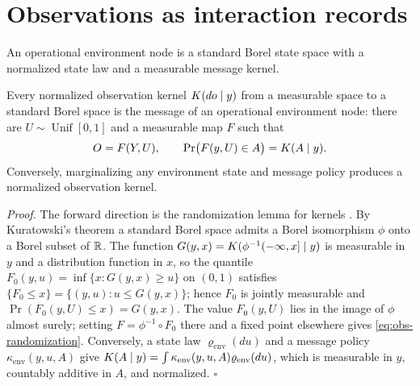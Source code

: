 \section{Observations as interaction records}
\label{sec:local-observation-equivalence}

An operational environment node is a standard Borel state space with a
normalized state law and a measurable message kernel.

Every normalized observation kernel $K(do\mid y)$ from a measurable space to a
standard Borel space is the message of an operational environment node: there
are $U\sim\operatorname{Unif}[0,1]$ and a measurable map $F$ such that
\begin{equation}
O=F(Y,U),
\qquad
\Pr\bigl(F(y,U)\in A\bigr)=K(A\mid y).
\label{eq:obs-randomization}
\end{equation}
Conversely, marginalizing any environment state and message policy produces a
normalized observation kernel. 

\noindent\emph{Proof.}
The forward direction is the randomization lemma for kernels
\citep{Kallenberg2021}. By Kuratowski's theorem a standard Borel space admits a
Borel isomorphism $\phi$ onto a Borel subset of $\mathbb R$. The function
$G(y,x)=K(\phi^{-1}(-\infty,x]\mid y)$ is measurable in $y$ and a
distribution function in $x$, so the quantile
$F_0(y,u)=\inf\{x:G(y,x)\geq u\}$ on $(0,1)$ satisfies
$\{F_0\leq x\}=\{(y,u):u\leq G(y,x)\}$; hence $F_0$ is jointly measurable and
$\Pr(F_0(y,U)\leq x)=G(y,x)$. The value $F_0(y,U)$ lies in the image of $\phi$
almost surely; setting $F=\phi^{-1}\circ F_0$ there and a fixed point elsewhere
gives \eqref{eq:obs-randomization}. Conversely, a state law
$\varrho_{\mathrm{env}}(du)$ and a message policy
$\kappa_{\mathrm{env}}(y,u,A)$ give
$K(A\mid y)=\int\kappa_{\mathrm{env}}(y,u,A)\varrho_{\mathrm{env}}(du)$, which
is measurable in $y$, countably additive in $A$, and normalized.
\hfill$\square$

